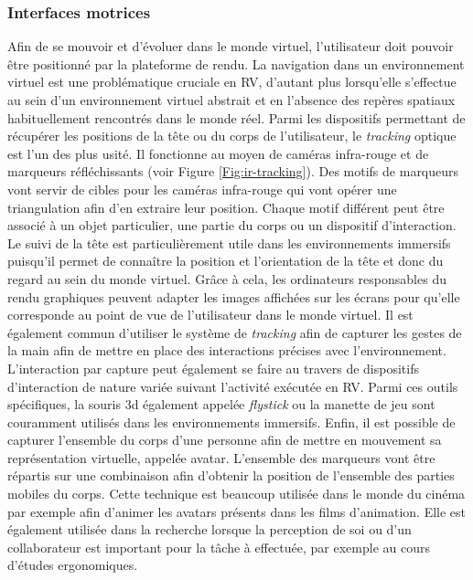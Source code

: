 \subsubsection{Interfaces motrices} \label{interface_motor}

Afin de se mouvoir et d'évoluer dans le monde virtuel, l'utilisateur doit pouvoir être positionné par la plateforme de rendu. La navigation dans un environnement virtuel est une problématique cruciale en RV, d'autant plus lorsqu'elle s'effectue au sein d'un environnement virtuel abstrait et en l'absence des repères spatiaux habituellement rencontrés dans le monde réel.
Parmi les dispositifs permettant de récupérer les positions de la tête ou du corps de l'utilisateur, le \textit{tracking} optique est l'un des plus usité. Il fonctionne au moyen de caméras infra-rouge et de marqueurs réfléchissants (voir Figure \ref{Fig:ir-tracking}). Des motifs de marqueurs vont servir de cibles pour les caméras infra-rouge qui vont opérer une triangulation afin d'en extraire leur position. Chaque motif différent peut être associé à un objet particulier, une partie du corps ou un dispositif d'interaction. Le suivi de la tête est particulièrement utile dans les environnements immersifs puisqu'il permet de connaître la position et l’orientation de la tête et donc du regard au sein du monde virtuel. Grâce à cela, les ordinateurs responsables du rendu graphiques peuvent adapter les images affichées sur les écrans pour qu'elle corresponde au point de vue de l'utilisateur dans le monde virtuel.
Il est également commun d'utiliser le système de \textit{tracking} afin de capturer les gestes de la main afin de mettre en place des interactions précises avec l'environnement. L'interaction par capture peut également se faire au travers de dispositifs d'interaction de nature variée suivant l'activité exécutée en RV. Parmi ces outils spécifiques, la souris 3d également appelée \textit{flystick} ou la manette de jeu sont couramment utilisés dans les environnements immersifs.
Enfin, il est possible de capturer l'ensemble du corps d'une personne afin de mettre en mouvement sa représentation virtuelle, appelée avatar. L'ensemble des marqueurs vont être répartis sur une combinaison afin d'obtenir la position de l'ensemble des parties mobiles du corps. Cette technique est beaucoup utilisée dans le monde du cinéma par exemple afin d'animer les avatars présents dans les films d'animation. Elle est également utilisée dans la recherche lorsque la perception de soi ou d'un collaborateur est important pour la tâche à effectuée, par exemple au cours d'études ergonomiques.

